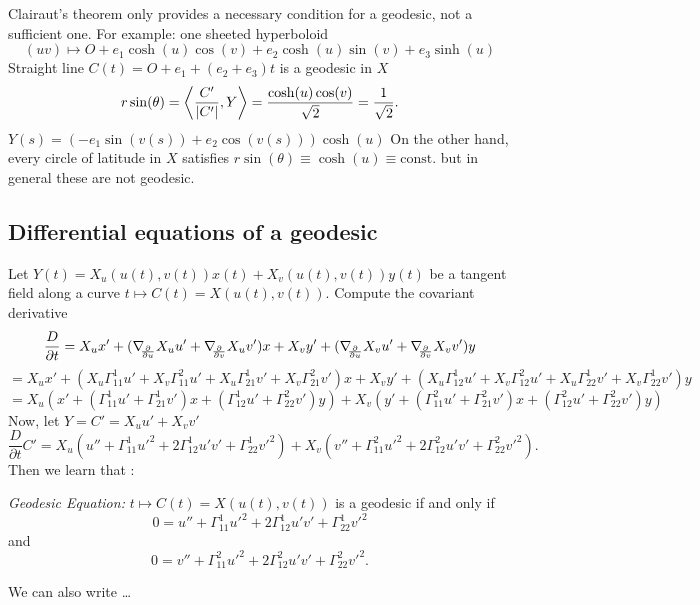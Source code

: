 \begin{remark, example}
	Clairaut's theorem only provides a necessary condition for a geodesic, not a sufficient one.
	For example: one sheeted hyperboloid
		\[ (uv) \mapsto O + e_1\cosh(u) \cos(v) + e_2 \cosh(u) \sin(v) + e_3 \sinh(u) \]
	Straight line $ C(t) = O + e_1 + (e_2 +e_3)t $ is a geodesic in $ X $
		\[r \sin (\theta) = \left \langle \dfrac{C'}{|C'|},Y \right\rangle = \dfrac{\cosh(u) \cos(v)}{\sqrt{2}}= \dfrac{1}{\sqrt{2}}. \]
	$ Y(s) = (-e_1\sin(v(s)) + e_2\cos(v(s)))\cosh(u) $
	On the other hand, every circle of latitude in $ X $ satisfies $ r\sin(\theta) \equiv \cosh(u) \equiv \mathrm{const.} $
	but in general these are not geodesic.	
\end{remark, example}

\subsection{Differential equations of a geodesic}
	
	Let $ Y(t) = X_u(u(t),v(t))x(t) + X_v(u(t),v(t))y(t) $ be a tangent field along a curve $ t \mapsto C(t) = X(u(t),v(t)). $
	Compute the covariant derivative
		\[ \dfrac{D}{\partial t} = X_ux' + (\nabla_{\!\!{\partial\over \partial u}} X_u u' + \nabla_{\!\!{\partial\over \partial v}} X_u v')x + X_vy' +  (\nabla_{\!\!{\partial\over \partial u}} X_v u' + \nabla_{\!\!{\partial\over \partial v}} X_v v')y \]
		\[ = X_ux' + (X_u\Gamma_{11}^1 u' + X_v\Gamma_{11}^2u' + X_u \Gamma_{21}^1v' + X_v \Gamma_{21}^2v')x +  X_vy' + (X_u\Gamma_{12}^1 u' + X_v\Gamma_{12}^2u' + X_u \Gamma_{22}^1v' + X_v \Gamma_{22}^1v')y \]
		\[ = X_u(x' + (\Gamma_{11}^1u' + \Gamma_{21}^1v')x + (\Gamma_{12}^1 u' + \Gamma_{22}^2v')y) + X_v(y' + (\Gamma_{11}^2u' + \Gamma_{21}^2v')x + (\Gamma_{12}^2 u' + \Gamma_{22}^2v')y)  \]
	Now, let $ Y = C' = X_u u' + X_v v' $
		\[ \dfrac{D}{\partial t} C' = X_u(u'' + \Gamma_{11}^1u'^2 + 2 \Gamma_{12}^1 u'v' +\Gamma_{22}^1 v'^2) + X_v(v'' + \Gamma_{11}^2u'^2 + 2\Gamma_{12}^2u'v' + \Gamma_{22}^2v'^2). \]
	Then we learn that :
	
\begin{definition}
	\emph{Geodesic Equation:} \label{Eq: geodesic}
		$ t \mapsto C(t) = X(u(t),v(t)) $ is a geodesic if and only if
			\[ 0 = u'' + \Gamma_{11}^1u'^2 + 2 \Gamma_{12}^1 u'v' +\Gamma_{22}^1 v'^2 \]
		and
		\[ 0 = v'' + \Gamma_{11}^2u'^2 + 2\Gamma_{12}^2u'v' + \Gamma_{22}^2v'^2. \]
		
		We can also write \dots
		
\end{definition}

